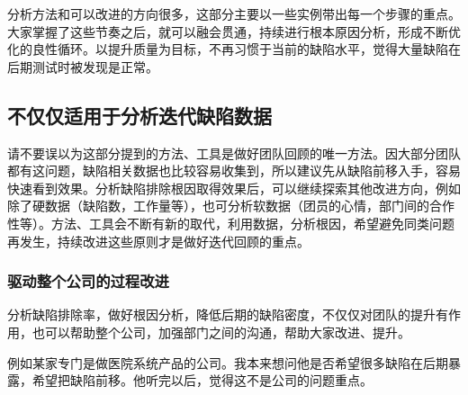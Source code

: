分析方法和可以改进的方向很多，这部分主要以一些实例带出每一个步骤的重点。大家掌握了这些节奏之后，就可以融会贯通，持续进行根本原因分析，形成不断优化的良性循环。以提升质量为目标，不再习惯于当前的缺陷水平，觉得大量缺陷在后期测试时被发现是正常。


\hypertarget{ux4e0dux4ec5ux4ec5ux9002ux7528ux4e8eux5206ux6790ux8fedux4ee3ux7f3aux9677ux6570ux636e}{%
\subsection{不仅仅适用于分析迭代缺陷数据}\label{ux4e0dux4ec5ux4ec5ux9002ux7528ux4e8eux5206ux6790ux8fedux4ee3ux7f3aux9677ux6570ux636e}}

请不要误以为这部分提到的方法、工具是做好团队回顾的唯一方法。因大部分团队都有这问题，缺陷相关数据也比较容易收集到，所以建议先从缺陷前移入手，容易快速看到效果。分析缺陷排除根因取得效果后，可以继续探索其他改进方向，例如除了硬数据（缺陷数，工作量等），也可分析软数据（团员的心情，部门间的合作性等）。方法、工具会不断有新的取代，利用数据，分析根因，希望避免同类问题再发生，持续改进这些原则才是做好迭代回顾的重点。

\hypertarget{ux9a71ux52a8ux6574ux4e2aux516cux53f8ux7684ux8fc7ux7a0bux6539ux8fdb}{%
\subsubsection{驱动整个公司的过程改进}\label{ux9a71ux52a8ux6574ux4e2aux516cux53f8ux7684ux8fc7ux7a0bux6539ux8fdb}}

分析缺陷排除率，做好根因分析，降低后期的缺陷密度，不仅仅对团队的提升有作用，也可以帮助整个公司，加强部门之间的沟通，帮助大家改进、提升。

例如某家专门是做医院系统产品的公司。我本来想问他是否希望很多缺陷在后期暴露，希望把缺陷前移。他听完以后，觉得这不是公司的问题重点。




